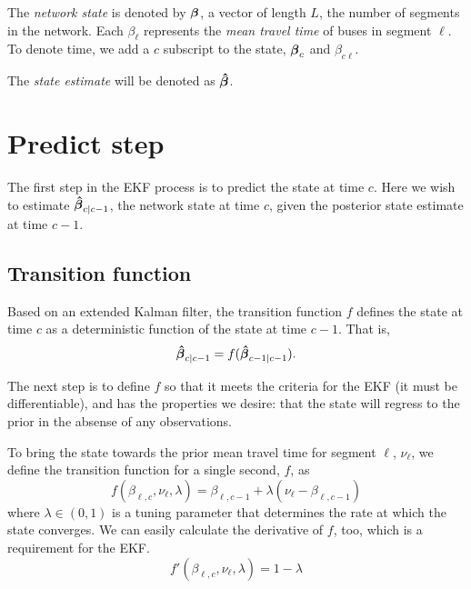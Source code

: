 \documentclass[english]{MastersDoctoralThesis}\usepackage[]{graphicx}\usepackage[]{color}
\begin{document}


The \emph{network state} is denoted by $\boldsymbol\beta$,
a vector of length $L$, the number of segments in the network.
Each $\beta_\ell$ represents the \emph{mean travel time} of buses
in segment $\ell$.
To denote time, we add a $c$ subscript to the state, $\boldsymbol\beta_c$
and $\beta_{c\ell}$.

The \emph{state estimate} will be denoted as $\boldsymbol{\hat\beta}$.

\section{Predict step}

The first step in the EKF process is to predict the state at time $c$.
Here we wish to estimate $\boldsymbol{\hat\beta}_{c|c-1}$, the network state at time $c$,
given the posterior state estimate at time $c-1$.

\subsection{Transition function}

Based on an extended Kalman filter,
the transition function $f$ defines the state at time $c$
as a deterministic function of the state at time $c-1$.
That is,
\begin{equation}
    \label{eq:kf_transition_basic}
    \boldsymbol{\hat\beta}_{c|c-1} = f(\boldsymbol{\hat\beta}_{c-1|c-1}).
\end{equation}

The next step is to define $f$ so that it meets the criteria for
the EKF (it must be differentiable), and has the properties we desire:
that the state will regress to the prior in the absense of any observations.

To bring the state towards the prior mean travel time for segment $\ell$,
$\nu_\ell$, we define the transition function for a single second, $f$, as
\begin{equation}
    \label{eq:kf_transition_def}
    f(\beta_{\ell,c}, \nu_\ell, \lambda) = \beta_{\ell,c-1} + \lambda (\nu_\ell - \beta_{\ell,c-1})
\end{equation}
where $\lambda \in (0,1)$ is a tuning parameter that determines the rate at which
the state converges.
We can easily calculate the derivative of $f$, too, which is a requirement for the EKF.
\begin{equation}
    \label{eq:kf_transition_fderiv}
    f'(\beta_{\ell,c}, \nu_\ell, \lambda) = 1 - \lambda
\end{equation}
\end{document}
